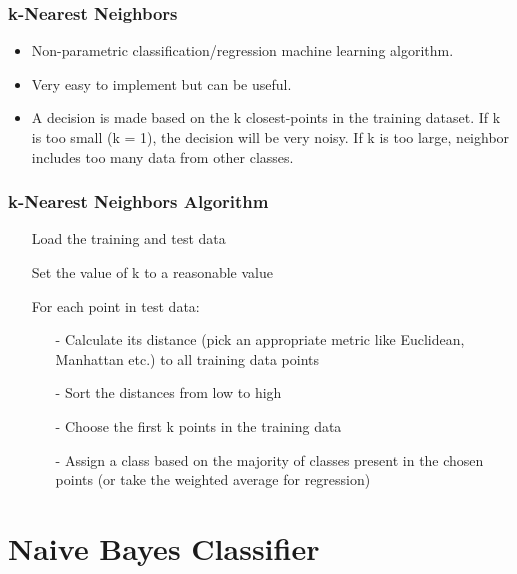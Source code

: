 \documentclass[notheorems, aspectratio=54, tikz,border=10pt,multi]{beamer}
\begin{document}
\begin{frame}
\frametitle{k-Nearest Neighbors}
\begin{itemize}
\item Non-parametric classification/regression machine learning algorithm. 
\item Very easy to implement but can be useful.
\item A decision is made based on the k closest-points in the training dataset. If k is too small (k = 1), the decision will be very noisy. If k is too large, neighbor includes too many data from other classes.  

\end{itemize}


\end{frame}
\begin{frame}
\frametitle{k-Nearest Neighbors Algorithm}
\begin{itemize}
\item[] Load the training and test data 
\item[] Set the value of k to a reasonable value 
\item[] For each point in test data:
\begin{itemize}
       \item[-] Calculate its distance (pick an appropriate metric like Euclidean, Manhattan etc.) to all training data points
       \item[-] Sort the distances from low to high
       \item[-] Choose the first k points in the training data
       \item[-] Assign a class based on the majority of classes present in the chosen points (or take the weighted average for regression)
       
\end{itemize}

\end{itemize}
\end{frame}

\section{Naive Bayes Classifier}
\end{document}
